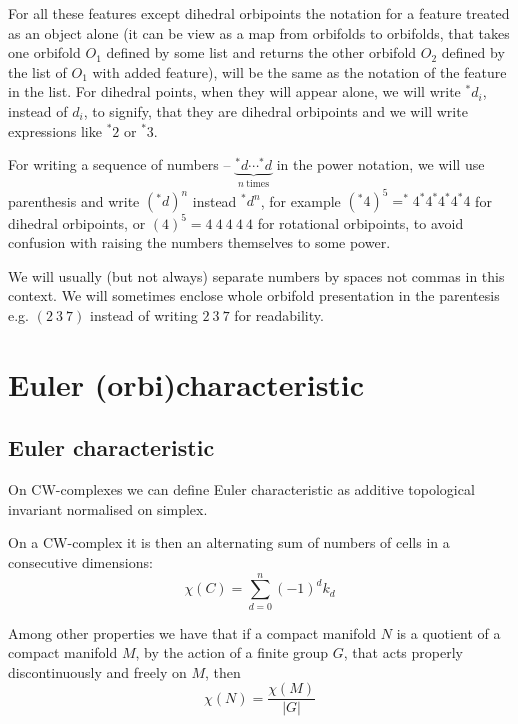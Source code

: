 For all these features except dihedral orbipoints 
the notation for a feature treated as an object alone (it can be view 
as a map from orbifolds to orbifolds, that takes one orbifold $O_1$ defined by some list and 
returns the other orbifold $O_2$ defined by the list of $O_1$ with added feature), will 
be the same as the notation of the feature in the list. For dihedral points, when they will appear 
alone, we will write $^*d_i$, instead of $d_i$, to signify, that they are dihedral orbipoints 
and we will write expressions like $^*2$ or $^*3$. 

For writing a sequence of numbers -- $\underbrace{^*d\cdots ^*d}_{n\ \mathrm{times}}$ 
in the power notation, we will use 
parenthesis and write $(^*d)^n$ instead $^*d^n$, for example 
$(^*4)^5 = ^*4^*4^*4^*4^*4$ for dihedral 
orbipoints, or $(4)^5 = 4\ 4\ 4\ 4\ 4$ for rotational orbipoints, to avoid confusion with 
raising the numbers themselves to some power. 

We will usually (but not always) 
separate numbers by spaces not commas in this context. 
We will sometimes enclose whole orbifold presentation in the parentesis e.g. $(2\ 3\ 7)$ instead 
of writing $2\ 3\ 7$ for readability.

\section{Euler (orbi)characteristic}\label{E_orb}
\label{\Eoc_as_a_sum}
\subsection{Euler characteristic}
On CW-complexes we can define Euler characteristic as additive topological invariant 
normalised on simplex.

On a CW-complex it is then an alternating sum of numbers of cells in 
a consecutive dimensions: 
\begin{equation}
\chi(C) = \sum_{d = 0}^n (-1)^d k_d
\end{equation}

Among other properties we have that if a compact manifold $N$ is a quotient of a compact 
manifold $M$, 
by the action of a finite group $G$, that acts properly discontinuously and freely on $M$, then
\begin{equation}
\chi(N) = \frac{\chi(M)}{|G|}
\end{equation}   

